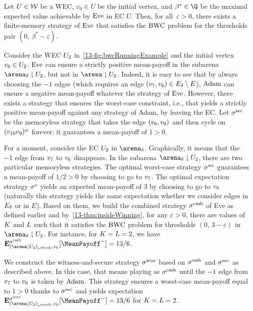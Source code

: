 \begin{theorem}
\label{13-thm:wns}
Let $U \in \mathcal{W}$ be a WEC, $v_0 \in U$ be the initial vertex, and $\beta^\ast \in \Q$ be the maximal expected value achievable by $\text{Eve}$ in EC $U$. Then, for all~$\varepsilon > 0$, there exists a finite-memory strategy of $\text{Eve}$ that satisfies the $\text{BWC}$ problem for the thresholds pair $(0,\, \beta^\ast - \varepsilon)$.
\end{theorem}

\begin{example}
Consider the WEC $U_{2}$ in~\cref{13-fig:bwcRunningExample} and the initial vertex $v_{6} \in U_{2}$. $\text{Eve}$ can ensure a strictly positive mean-payoff in the subarena $\gameNonZero \reduc \ec_{2}$, but not in $\arena \reduc \ec_{2}$. Indeed, it is easy to see that by always choosing the $-1$ edges (which requires an edge $(v_{7}, v_{6}) \in E_{\delta} \setminus E$), $\text{Adam}$ can ensure a negative mean-payoff whatever the strategy of $\text{Eve}$. However, there exists a strategy that ensures the worst-case constraint, i.e., that yields a strictly positive mean-payoff against any strategy of Adam, by leaving the EC. Let $\sigma^{\text{sec}}$ be the memoryless strategy that takes the edge $(v_{6}, v_{9})$ and then cycle on $(v_{10}v_{9})^{\omega}$ forever: it guarantees a mean-payoff of $1 > 0$.

For a moment, consider the EC $U_{2}$ in $\gameNonZero$. Graphically, it means that the $-1$ edge from $v_{7}$ to $v_{6}$ disappears. In the subarena $\gameNonZero \reduc \ec_{2}$, there are two particular memoryless strategies. The optimal worst-case strategy $\sigma^{\text{wc}}$ guarantees a mean-payoff of $1/2 > 0$ by choosing to go to $v_{7}$. The optimal expectation strategy $\sigma^{\text{e}}$ yields an expected mean-payoff of $3$ by choosing to go to $v_{8}$ (naturally this strategy yields the same expectation whether we consider edges in $E_{\delta}$ or in $E$). Based on them, we build the combined strategy $\sigma^{\text{cmb}}$ of Eve as defined earlier and by~\cref{13-thm:insideWinning}, for any $\varepsilon > 0$, there are values of $K$ and $L$ such that it satisfies the $\text{BWC}$ problem for thresholds $(0,\, 3-\varepsilon)$ in $\gameNonZero \reduc \ec_{2}$. For instance, for $K = L = 2$, we have $\expv^{\stratComb}_{(\arena \reduc \ec_{2})_{\tau^\text{stoch}},v_{6}}[\MeanPayoff^{-}] = 13/6$.

We construct the witness-and-secure strategy $\sigma^{\text{wns}}$ based on $\sigma^{\text{cmb}}$ and $\sigma^{\text{sec}}$ as described above. In this case, that means playing as $\sigma^{\text{cmb}}$ until the $-1$ edge from $v_{7}$ to $v_{6}$ is taken by $\text{Adam}$. This strategy ensures a worst-case mean-payoff equal to $1 > 0$ thanks to $\sigma^{\text{sec}}$ and yields expectation $\expv^{\stratWNS}_{(\arena \reduc \ec_{2})_{\tau^\text{stoch}},v_{6}}[\MeanPayoff^{-}] = 13/6$ for $K = L = 2$.


\end{example}
